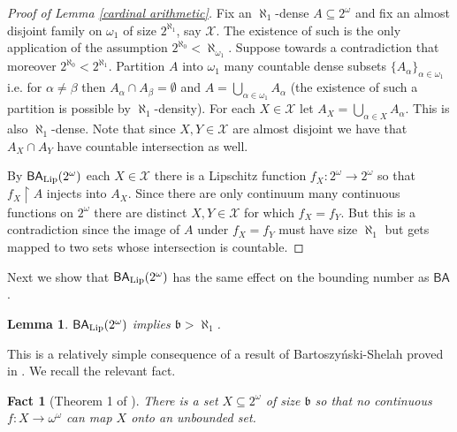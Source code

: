 \documentclass[leqno,11pt]{amsart}
\newtheorem{lemma}[theorem]{Lemma}
\newtheorem{fact}[theorem]{Fact}
\theoremstyle{definition}
\theoremstyle{remark}
\def\hook{\upharpoonright}
\def\BA{\mathsf{BA}}
\def\baire{\omega^\omega}
\def\mfb{\mathfrak b}
\def\cc{2^{\aleph_0}}
\begin{document}
\begin{proof}[Proof of Lemma \ref{cardinal arithmetic}]
    Fix an $\aleph_1$-dense $A \subseteq 2^\omega$ and fix an almost disjoint family on $\omega_1$ of size $2^{\aleph_1}$, say $\mathcal X$. The existence of such is the only application of the assumption $\cc < \aleph_{\omega_1}$. Suppose towards a contradiction that moreover $2^{\aleph_0} < 2^{\aleph_1}$. Partition $A$ into $\omega_1$ many countable dense subsets $\{A_\alpha\}_{\alpha \in \omega_1}$ i.e. for $\alpha \neq \beta$ then $A_\alpha \cap A_\beta = \emptyset$ and $A = \bigcup_{\alpha \in \omega_1} A_\alpha$ (the existence of such a partition is possible by $\aleph_1$-density).  For each $X \in \mathcal X$ let $A_X = \bigcup_{\alpha \in X} A_\alpha$. This is also $\aleph_1$-dense. Note that since $X, Y \in \mathcal X$ are almost disjoint we have that $A_X \cap A_Y$ have countable intersection as well.

    By $\BA_{\rm Lip}(2^\omega)$ each $X \in \mathcal X$ there is a Lipschitz function $f_X:2^\omega \to 2^\omega$ so that $f_X \hook A$ injects into $A_X$. Since there are only continuum many continuous functions on $2^\omega$ there are distinct $X, Y \in \mathcal X$ for which $f_X = f_Y$. But this is a contradiction since the image of $A$ under $f_X = f_Y$ must have size $\aleph_1$ but gets mapped to two sets whose intersection is countable. 
\end{proof}


Next we show that $\BA_{\rm Lip}(2^\omega)$ has the same effect on the bounding number as $\BA$. 
\begin{lemma}
    $\BA_{\rm Lip}(2^\omega)$ implies $\mfb > \aleph_1$. \label{btheorem}
\end{lemma}

This is a relatively simple consequence of a result of Bartoszy\'nski-Shelah proved in \cite{continuousimagesofsetsofreals}. We recall the relevant fact.

\begin{fact}[Theorem 1 of \cite{continuousimagesofsetsofreals}]
    There is a set $X \subseteq 2^\omega$ of size $\mfb$ so that no continuous $f:X \to \baire$ can map $X$ onto an unbounded set. \label{BSfact}
\end{fact}
\end{document}
